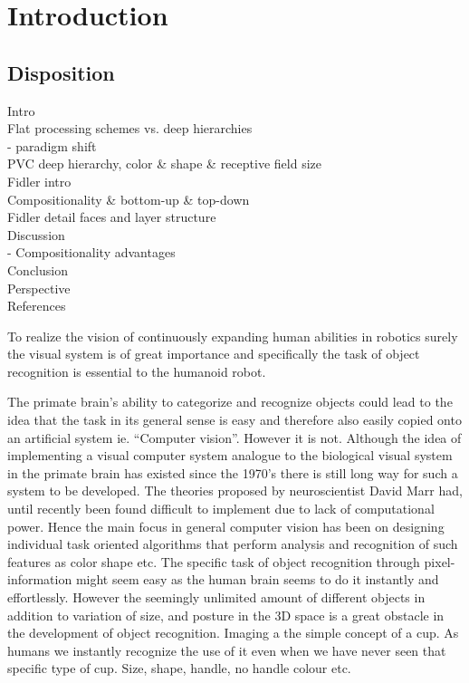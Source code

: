 \section{Introduction}
\label{sec:introduction}


\subsection{Disposition}
Intro \\
Flat processing schemes vs. deep hierarchies\\
-     paradigm shift \\
PVC deep hierarchy, color \& shape \& receptive field size\\
Fidler intro\\
Compositionality \& bottom-up \& top-down\\
Fidler detail faces and layer structure \\
Discussion \\
-    Compositionality advantages \\
Conclusion \\
Perspective \\
References \\


To realize the vision of continuously expanding human abilities in robotics surely the visual system is of great importance and specifically the task of object recognition is essential to the humanoid robot.

The primate brain's ability to categorize and recognize objects could lead to the idea that the task in its general sense is easy and therefore also easily copied onto an artificial system ie. “Computer vision”. However it is not.
Although the idea of implementing a visual computer system analogue to the biological visual system in the primate brain has existed since the 1970's there is still long way for such a system to be developed. The theories proposed by neuroscientist David Marr \citep{VisualHierarchy} had, until recently been found difficult to implement due to lack of computational power. Hence the main focus in general computer vision has been on designing individual task oriented algorithms that perform analysis and recognition of such features as color shape etc.
The specific task of object recognition through pixel-information might seem easy as the human brain seems to do it instantly and effortlessly. However the seemingly unlimited amount of different objects in addition to variation of size, and posture in the 3D space is a great obstacle in the development of object recognition. Imaging a the simple concept of a cup. As humans we instantly recognize the use of it even when we have never seen that specific type of cup. Size, shape, handle, no handle colour etc.